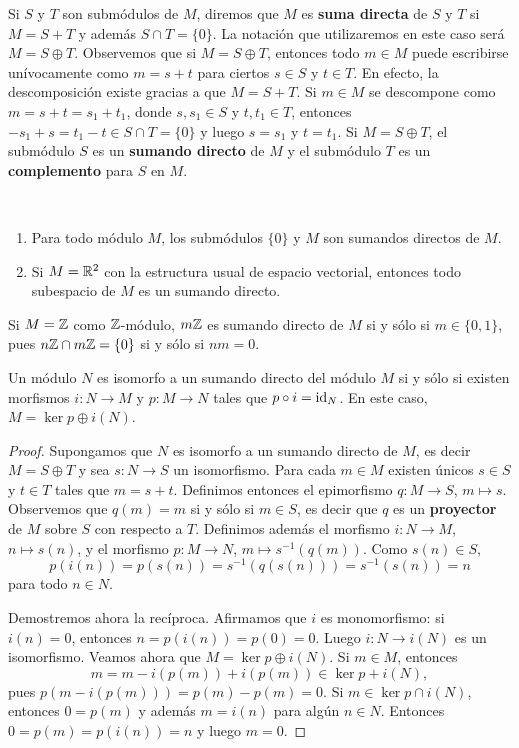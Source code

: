 Si $S$ y $T$ son submódulos de $M$, diremos que $M$ es \textbf{suma directa} de $S$ y $T$ si 
$M=S+T$ y además $S\cap T=\{0\}$. La notación que utilizaremos en este caso será $M=S\oplus T$. Observemos que
si $M=S\oplus T$, entonces 
todo $m\in M$ puede escribirse unívocamente como $m=s+t$ para ciertos $s\in S$ y $t\in T$. En efecto,
la descomposición existe gracias a que $M=S+T$. Si $m\in M$ se descompone como
$m=s+t=s_1+t_1$, donde $s,s_1\in S$ y $t,t_1\in T$, entonces
$-s_1+s=t_1-t\in S\cap T=\{0\}$ y luego $s=s_1$ y $t=t_1$.  Si $M=S\oplus T$, el submódulo $S$ es un \textbf{sumando directo} de $M$ y el submódulo $T$ es un \textbf{complemento} para $S$ en $M$.   	
\begin{examples}\
	\begin{enumerate}
	\item Para todo módulo $M$, los submódulos $\{0\}$ y $M$ son sumandos directos de $M$.
	\item Si $M=\mathbb{R}^2$ con la estructura usual de espacio vectorial, entonces todo subespacio de $M$ es un sumando directo. 	
	\end{enumerate}
\end{examples}

\begin{example}
Si $M=\mathbb{Z}$ como $\mathbb{Z}$-módulo, $m\mathbb{Z}$ es sumando directo de $M$ si y sólo si $m\in\{0,1\}$, pues $n\mathbb{Z}\cap m\mathbb{Z}=\{0\}$ si y sólo si $nm=0$.
\end{example}

\begin{proposition}
Un módulo $N$ es isomorfo a un sumando directo del módulo $M$ si y sólo si 
existen morfismos $i\colon N\to M$ y $p\colon M\to N$ 
tales que $p\circ i=\operatorname{id}_N$. En este caso, $M=\ker p\oplus i(N)$.  
\end{proposition}

\begin{proof}
	Supongamos que $N$ es isomorfo a un sumando directo de $M$, es decir $M=S\oplus T$ y sea $s\colon N\to S$ un isomorfismo. Para
	cada $m\in M$ existen únicos $s\in S$ y $t\in T$ tales que $m=s+t$. Definimos entonces el epimorfismo 
	$q\colon M\to S$, $m\mapsto s$. Observemos que $q(m)=m$ si y sólo si $m\in S$, 
	es decir que $q$ es un \textbf{proyector} de $M$ sobre $S$ con respecto a $T$. 
	Definimos además el morfismo 
	$i\colon N\to M$, $n\mapsto s(n)$, y el morfismo $p\colon M\to N$, $m\mapsto s^{-1}(q(m))$. Como $s(n)\in S$, 
	\[
	p(i(n))=p(s(n))=s^{-1}(q(s(n)))=s^{-1}(s(n))=n
	\]
	para todo $n\in N$. 
	
	Demostremos ahora la recíproca. Afirmamos que $i$ es monomorfismo: si $i(n)=0$, entonces
	$n=p(i(n))=p(0)=0$. Luego $i\colon N\to i(N)$ es un isomorfismo. 
	Veamos ahora que $M=\ker p\oplus i(N)$. Si $m\in M$, entonces
	\[
	m=m-i(p(m))+i(p(m))\in\ker p+i(N),
	\] 
	pues
	$p(m-i(p(m)))=p(m)-p(m)=0$. Si $m\in\ker p\cap i(N)$, entonces $0=p(m)$ y además $m=i(n)$ para algún $n\in N$. Entonces
	$0=p(m)=p(i(n))=n$ y luego $m=0$.      
\end{proof}

